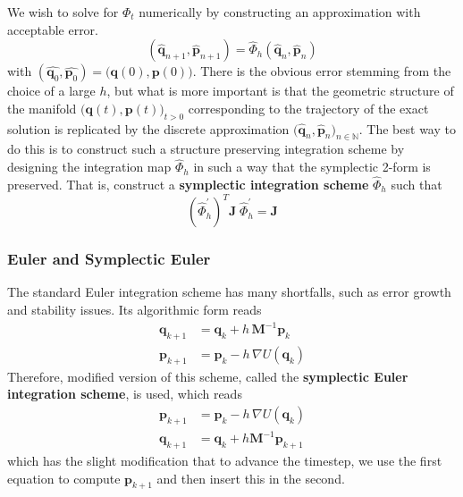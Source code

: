     We wish to solve for $\Phi_t$ numerically by constructing an approximation with acceptable error. 
    \begin{equation}
      (\hat{\mathbf{q}}_{n+1}, \hat{\mathbf{p}}_{n+1}) = \hat{\Phi}_{h} (\hat{\mathbf{q}}_{n}, \hat{\mathbf{p}}_{n})
    \end{equation}
    with $(\hat{\mathbf{q}_0}, \hat{\mathbf{p}_0}) = \big( \mathbf{q}(0), \mathbf{p}(0)\big)$. There is the obvious error stemming from the choice of a large $h$, but what is more important is that the geometric structure of the manifold $\big( \mathbf{q}(t), \mathbf{p}(t)\big)_{t > 0}$ corresponding to the trajectory of the exact solution is replicated by the discrete approximation $\big(\hat{\mathbf{q}}_n, \hat{\mathbf{p}}_n\big)_{n \in \mathbb{N}}$. The best way to do this is to construct such a structure preserving integration scheme by designing the integration map $\hat{\Phi}_{h}$ in such a way that the symplectic 2-form is preserved. That is, construct a \textbf{symplectic integration scheme} $\hat{\Phi}_{h}$ such that 
    \begin{equation}
      (\hat{\Phi}_{h}^\prime)^T \mathbf{J} \; \hat{\Phi}_{h}^\prime = \mathbf{J}
    \end{equation}

    \subsubsection{Euler and Symplectic Euler}

      The standard Euler integration scheme has many shortfalls, such as error growth and stability issues. Its algorithmic form reads 
      \begin{align*}
        \mathbf{q}_{k + 1} & = \mathbf{q}_k + h \, \mathbf{M}^{-1} \mathbf{p}_k \\
        \mathbf{p}_{k + 1} & = \mathbf{p}_k - h \, \nabla U(\mathbf{q}_k)
      \end{align*}
      Therefore, modified version of this scheme, called the \textbf{symplectic Euler integration scheme}, is used, which reads 
      \begin{align*}
        \mathbf{p}_{k+1} & = \mathbf{p}_k - h \, \nabla U(\mathbf{q}_k) \\
        \mathbf{q}_{k+1} & = \mathbf{q}_k + h \mathbf{M}^{-1} \mathbf{p}_{k+1} 
      \end{align*}
      which has the slight modification that to advance the timestep, we use the first equation to compute $\mathbf{p}_{k+1}$ and then insert this in the second. 

